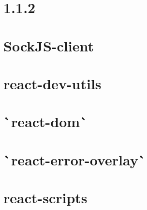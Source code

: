 \documentclass[twoside]{book}
\newcommand{\+}{\discretionary{\mbox{\scriptsize$\hookleftarrow$}}{}{}}
\begin{document}
\chapter{1.1.2}
\label{md__c_1_workspace_demo_src_main_script_node_modules_react-dev-utils_node_modules_sockjs-client__changelog}

\chapter{Sock\+J\+S-\/client}
\label{md__c_1_workspace_demo_src_main_script_node_modules_react-dev-utils_node_modules_sockjs-client__r_e_a_d_m_e}

\chapter{react-\/dev-\/utils}
\label{md__c_1_workspace_demo_src_main_script_node_modules_react-dev-utils__r_e_a_d_m_e}

\chapter{\`{}react-\/dom\`{}}
\label{md__c_1_workspace_demo_src_main_script_node_modules_react-dom__r_e_a_d_m_e}

\chapter{\`{}react-\/error-\/overlay\`{}}
\label{md__c_1_workspace_demo_src_main_script_node_modules_react-error-overlay__r_e_a_d_m_e}

\chapter{react-\/scripts}
\label{md__c_1_workspace_demo_src_main_script_node_modules_react-scripts__r_e_a_d_m_e}

\end{document}
